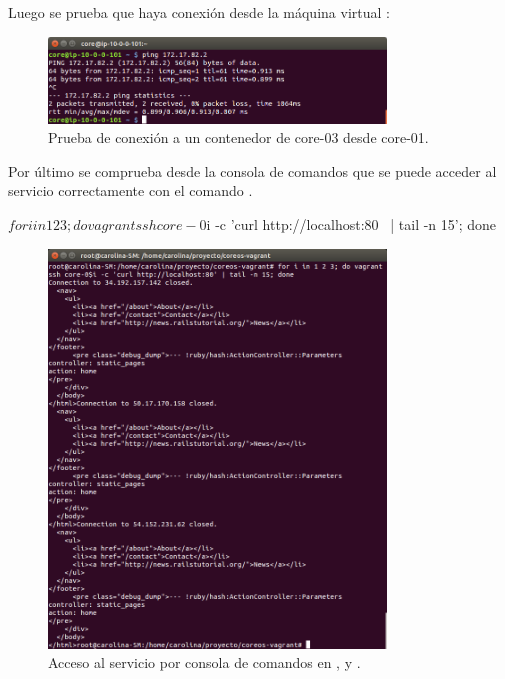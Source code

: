 Luego se prueba que haya conexión desde la máquina virtual :

\begin{figure}[H]
\centering
\includegraphics[width=0.8\textwidth]{images/figures/ping-1.png}
\caption{Prueba de conexión a un contenedor de core-03 desde core-01.\label{fig:figure_placement_example}}
\end{figure}

Por último se comprueba desde la consola de comandos que se puede acceder al servicio correctamente con el comando . 

\begin{code}
$ for i in 1 2 3; do vagrant ssh core-0$i -c 'curl http://localhost:80 \
  | tail -n 15'; done
\end{code}

\begin{figure}[H]
\centering
\includegraphics[width=0.8\textwidth]{images/figures/curl-aws-3.png}
\caption{Acceso al servicio por consola de comandos en \kode{core-01},  y .\label{fig:figure_placement_example}}
\end{figure}


